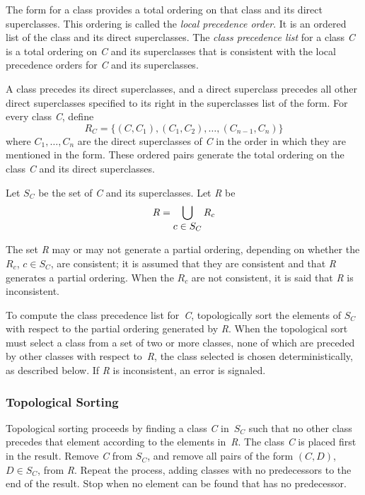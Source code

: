 The  form for a class provides a total ordering on that
class and its direct superclasses.  This ordering is called the \emph{local
  precedence order}.  It is an ordered list of the class and its 
direct superclasses. The \emph{class precedence list\/} for a
class \emph{C} is a total ordering on \emph{C} and its superclasses that is consistent
with the local precedence orders for \emph{C} and its superclasses.

A class precedes its direct superclasses, and a
direct superclass precedes all other direct superclasses specified to
its right in the superclasses list of the  form.  For
every class \emph{C}, define
$$R_C=\{(C,C_1),(C_1,C_2),\ldots,(C_{n-1},C_{n})\}$$
where $C_1,\ldots,C_{n}$ are
the direct superclasses of \emph{C} in the order in which
they are mentioned in the  form. These ordered pairs
generate the total ordering on the class \emph{C} and its direct
superclasses.

Let $S_C$ be the set of \emph{C} and its superclasses. Let \emph{R} be
$$R=\bigcup_{\textstyle c\in {S_{C}}} R_{c}$$

The set \emph{R} may or may not generate a partial ordering, depending on
whether the $R_{c}$, $c\in S_{C}$,
are consistent; it is assumed
that they are consistent and that \emph{R} generates a partial ordering.
When the $R_{c}$ are not consistent, it is said that \emph{R} is inconsistent.


To compute the class precedence list for~\emph{C},
topologically sort the elements of $S_{C}$ with respect to the
partial ordering generated by \emph{R}.  When the topological
sort must select a class from a set of two or more classes, none of
which are preceded by other classes with respect to~\emph{R},
the class selected is chosen deterministically, as described below.
If \emph{R} is inconsistent, an error is signaled.



\subsubsection{Topological Sorting}

Topological sorting proceeds by finding a class \emph{C} in~$S_{C}$ such
that no other class precedes that element according to the elements
in~\emph{R}.  The class \emph{C} is placed first in the result.
Remove \emph{C} from $S_{C}$, and remove all pairs of the form
$(C,D)$,
$D\in S_{C}$, from \emph{R}. Repeat the process, adding
classes with no predecessors to the end of the result.  Stop when no
element can be found that has no predecessor.

